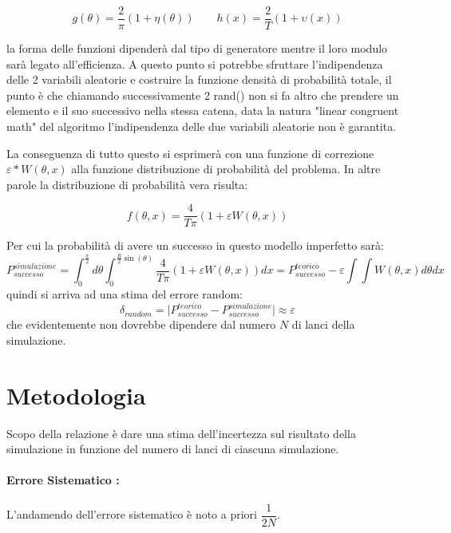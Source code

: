 \documentclass{article}
\begin{document}
	\begin{displaymath}
	g(\theta)=\dfrac{2}{\pi}(1+\eta(\theta))
	\qquad
	h(x)=\dfrac{2}{T}(1+\upsilon(x))
	\end{displaymath}

la forma delle funzioni dipenderà dal tipo di generatore mentre il loro modulo sarà legato all'efficienza.
A questo punto si potrebbe sfruttare l'indipendenza delle 2 variabili aleatorie e costruire la funzione  densità di probabilità totale, il punto è che chiamando successivamente 2 rand() non si fa altro che prendere un elemento e il suo successivo nella stessa catena, data la natura "linear congruent math" del algoritmo l'indipendenza delle due variabili aleatorie non è garantita.

La conseguenza di tutto questo si esprimerà con una funzione di correzione $\varepsilon*W(\theta,x)$ alla funzione distribuzione di probabilità del problema.
In altre parole la distribuzione di probabilità vera risulta:

	\begin{equation}
	f(\theta,x)=\dfrac{4}{T\pi}(1+\varepsilon W(\theta,x))
	\end{equation}

Per cui la probabilità di avere un successo in questo modello imperfetto sarà:
	\begin{equation}
	P_{successo}^{simulazione}=\int_{0}^{\frac{\pi}{2}}d\theta\int_{0}^{\frac{R}{2}\sin(\theta)}\dfrac{4}{T\pi}(1+\varepsilon W(\theta,x))dx
	=P_{successo}^{teorico} - \varepsilon\int\int W(\theta,x)d\theta dx
	\end{equation}
quindi si arriva ad una stima del errore random:
	\begin{equation}	
	\delta_{random}=\mid P_{successo}^{teorico} - P_{successo}^{simulazione} \mid \approx \varepsilon
	\end{equation}
che evidentemente non dovrebbe dipendere dal numero $N$ di lanci della simulazione. 

\section{Metodologia}
Scopo della relazione è dare una stima dell'incertezza sul risultato della simulazione in funzione del numero di lanci di ciascuna simulazione.
\paragraph{Errore Sistematico :}
L'andamendo dell'errore sistematico è noto a priori $\dfrac{1}{2N}$.
\end{document}
